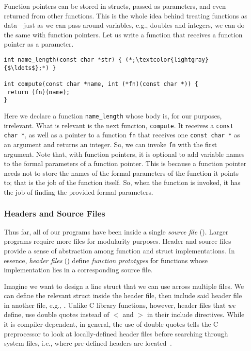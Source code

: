 Function pointers can be stored in structs, passed as parameters, and even returned from other functions. This is the whole idea behind treating functions as data---just as we can pass around variables, e.g., doubles and integers, we can do the same with function pointers. Let us write a function that receives a function pointer as a parameter.

\begin{cl}[]{}\begin{lstlisting}[language=MyC]
int name_length(const char *str) { (*;\textcolor{lightgray}{$\ldots$};*) }

int compute(const char *name, int (*fn)(const char *)) {
 return (fn)(name);
}
\end{lstlisting}\end{cl}

Here we declare a function \texttt{name\_length} whose body is, for our purposes, irrelevant. What is relevant is the next function, \texttt{compute}. It receives a \texttt{const char *}, as well as a pointer to a function \texttt{fn} that receives one \texttt{const char *} as an argument and returns an integer. So, we can invoke \texttt{fn} with the first argument. Note that, with function pointers, it is optional to add variable names to the formal parameters of a function pointer. This is because a function pointer needs not to store the names of the formal parameters of the function it points to; that is the job of the function itself. So, when the function is invoked, it has the job of finding the provided formal parameters.

\subsubsection*{Headers and Source Files}

Thus far, all of our programs have been inside a single \textit{source file} (). Larger programs require more files for modularity purposes. Header and source files provide a sense of abstraction among function and struct implementations. In essence, \textit{header files} () define \textit{function prototypes} for functions whose implementation lies in a corresponding source file.

Imagine we want to design a line struct that we can use across multiple files. We can define the relevant struct inside the header file, then include said header file in another file, e.g., . Unlike C library functions, however, header files that \textit{we} define, use double quotes  instead of $<$ and $>$ in their include directives. While it is compiler-dependent, in general, the use of double quotes tells the C preprocessor to look at locally-defined header files before searching through system files, i.e., where pre-defined headers are located~\cite{ISO:C99}.

